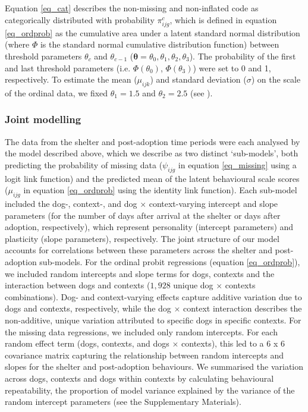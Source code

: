 \documentclass[12pt]{article}
\begin{document}
Equation \ref{eq_cat} describes the non-missing and non-inflated code as categorically distributed with probability $\pi_{ijg}^c$, which is defined in equation \ref{eq_ordprob} as the cumulative area under a latent standard normal distribution (where $\Phi$ is the standard normal cumulative distribution function) between threshold parameters $\theta_{c}$ and $\theta_{c-1}$ ($\boldsymbol{\theta} = {\theta_{0}, \theta_{1}, \theta_{2}, \theta_{3}}$). The probability of the first and last threshold parameters (i.e. $\Phi({\theta_{0}})$, $\Phi({\theta_{3}})$) were set to 0 and 1, respectively. To estimate the mean ($\mu_{ijk}$) and standard deviation ($\sigma$) on the scale of the ordinal data, we fixed $\theta_{1} = 1.5$ and $\theta_{2} = 2.5$ (see \cite{kruschke2014}).

\subsubsection{Joint modelling}
The data from the shelter and post-adoption time periods were each analysed by the model described above, which we describe as two distinct `sub-models', both predicting the probability of missing data ($\psi_{ijg}$ in equation \ref{eq_missing} using a logit link function) and the predicted mean of the latent behavioural scale scores ($\mu_{ijg}$ in equation \ref{eq_ordprob} using the identity link function). Each sub-model included the dog-, context-, and dog $\times$ context-varying intercept and slope parameters (for the number of days after arrival at the shelter or days after adoption, respectively), which represent personality (intercept parameters) and plasticity (slope parameters), respectively.  The joint structure of our model accounts for correlations between these parameters across the shelter and post-adoption sub-models. For the ordinal probit regressions (equation \ref{eq_ordprob}), we included random intercepts and slope terms for dogs, contexts and the interaction between dogs and contexts ($1,928$ unique dog $\times$ contexts combinations). Dog- and context-varying effects capture additive variation due to dogs and contexts, respectively, while the dog $\times$ context interaction describes the non-additive, unique variation attributed to specific dogs in specific contexts. For the missing data regressions, we included only random intercepts. For each random effect term (dogs, contexts, and dogs $\times$ contexts), this led to a 6 x 6 covariance matrix capturing the relationship between random intercepts and slopes for the shelter and post-adoption behaviours. We summarised the variation across dogs, contexts and dogs within contexts by calculating behavioural repeatability, the proportion of model variance explained by the variance of the random intercept parameters (see the Supplementary Materials). 
\end{document}
